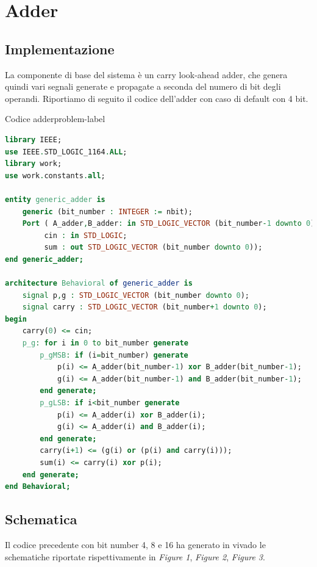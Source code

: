 \section{Adder}
\subsection{Implementazione}
La componente di base del sistema è un carry look-ahead adder, che genera quindi vari segnali generate e propagate a seconda del numero di bit degli operandi.
Riportiamo di seguito il codice dell'adder con caso di default con 4 bit.

\begin{problem}{Codice adder}{problem-label}
\begin{lstlisting}[language=VHDL]
library IEEE;
use IEEE.STD_LOGIC_1164.ALL;
library work;
use work.constants.all;

entity generic_adder is
    generic (bit_number : INTEGER := nbit);
    Port ( A_adder,B_adder: in STD_LOGIC_VECTOR (bit_number-1 downto 0);
         cin : in STD_LOGIC;
         sum : out STD_LOGIC_VECTOR (bit_number downto 0));
end generic_adder;

architecture Behavioral of generic_adder is
    signal p,g : STD_LOGIC_VECTOR (bit_number downto 0);
    signal carry : STD_LOGIC_VECTOR (bit_number+1 downto 0);
begin
    carry(0) <= cin;
    p_g: for i in 0 to bit_number generate
        p_gMSB: if (i=bit_number) generate
            p(i) <= A_adder(bit_number-1) xor B_adder(bit_number-1);
            g(i) <= A_adder(bit_number-1) and B_adder(bit_number-1);
        end generate;
        p_gLSB: if i<bit_number generate
            p(i) <= A_adder(i) xor B_adder(i);
            g(i) <= A_adder(i) and B_adder(i);
        end generate;
        carry(i+1) <= (g(i) or (p(i) and carry(i)));
        sum(i) <= carry(i) xor p(i);
    end generate;
end Behavioral;
\end{lstlisting}
\end{problem}

\subsection{Schematica}
Il codice precedente con bit number 4, 8 e 16 ha generato in vivado le schematiche riportate rispettivamente in \textit{Figure 1}, \textit{Figure 2}, \textit{Figure 3}.

